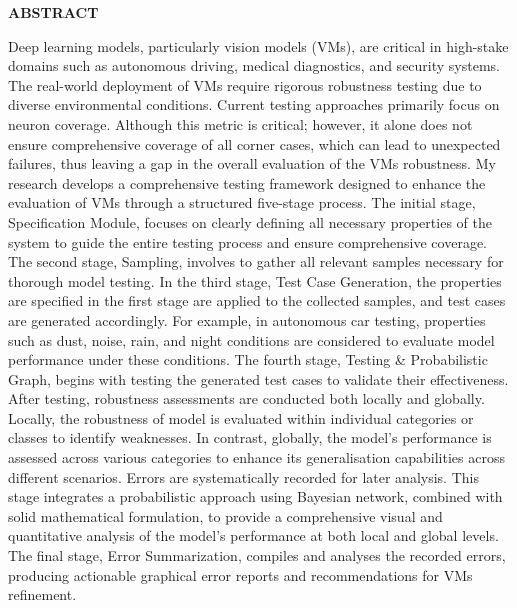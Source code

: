 
\begin{center}
{\fontsize{16}{15} \bf ABSTRACT}
\vspace{0.4cm}
\end{center}
\normalsize

Deep learning models, particularly vision models (VMs), are critical in high-stake domains such as autonomous driving, medical diagnostics, and security systems. The real-world deployment of VMs require rigorous robustness testing due to diverse environmental conditions. Current testing approaches primarily focus on neuron coverage. Although this metric is critical; however, it alone does not ensure comprehensive coverage of all corner cases, which can lead to unexpected failures, thus leaving a gap in the overall evaluation of the VMs robustness. My research develops a comprehensive testing framework designed to enhance the evaluation of VMs through a structured five-stage process.
The initial stage, Specification Module, focuses on clearly defining all necessary properties of the system to guide the entire testing process and ensure comprehensive coverage. The second stage, Sampling, involves to gather all relevant samples necessary for thorough model testing. In the third stage, Test Case Generation, the properties are specified in the first stage are applied to the collected samples, and test cases are generated accordingly. For example, in autonomous car testing, properties such as dust, noise, rain, and night conditions are considered to evaluate model performance under these conditions. The fourth stage, Testing \& Probabilistic Graph, begins with testing the generated test cases to validate their effectiveness. After testing,  robustness assessments are conducted both locally and globally. Locally, the robustness of model is evaluated within individual categories or classes to identify weaknesses. In contrast, globally, the model’s performance is assessed across various categories to enhance its generalisation capabilities across different scenarios. Errors are systematically recorded for later analysis. This stage integrates a probabilistic approach using Bayesian network, combined with solid mathematical formulation, to provide a comprehensive visual and quantitative analysis of the model’s performance at both local and global levels. The final stage, Error Summarization, compiles and analyses the recorded errors, producing actionable graphical error reports and recommendations for VMs refinement.

\clearpage

